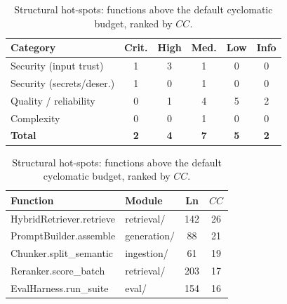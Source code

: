 \begin{table}[!tp]
  \centering
  \begin{minipage}[t]{0.42\textwidth}
    \centering
    \caption{Fused findings by severity and category ($N=20$).}
    \label{tab:severity}
    \renewcommand{\arraystretch}{1.25}
    \small
    \begin{tabularx}{\linewidth}{@{}X ccccc@{}}
      \toprule
      \textbf{Category} & \textbf{Crit.} & \textbf{High} & \textbf{Med.}
        & \textbf{Low} & \textbf{Info} \\
      \midrule
      Security (input trust)    & 1 & 3 & 1 & 0 & 0 \\
      Security (secrets/deser.) & 1 & 0 & 1 & 0 & 0 \\
      Quality / reliability     & 0 & 1 & 4 & 5 & 2 \\
      Complexity                & 0 & 0 & 1 & 0 & 0 \\
      \midrule
      \textbf{Total}            & \textbf{2} & \textbf{4} & \textbf{7}
        & \textbf{5} & \textbf{2} \\
      \bottomrule
    \end{tabularx}
  \end{minipage}\hfill
  \begin{minipage}[t]{0.55\textwidth}
    \centering
    \caption{Structural hot-spots: functions above the default
             cyclomatic budget, ranked by $CC$.}
    \label{tab:hotspots}
    \renewcommand{\arraystretch}{1.25}
    \small
    \begin{tabularx}{\linewidth}{@{}
        >{\ttfamily\scriptsize\raggedright\arraybackslash}X
        >{\ttfamily\scriptsize}l c c @{}}
      \toprule
      \normalfont\textbf{Function} & \normalfont\textbf{Module} &
      \normalfont\textbf{Ln} & \normalfont\textbf{$CC$} \\
      \midrule
      HybridRetriever.retrieve & retrieval/    & 142 & 26 \\
      PromptBuilder.assemble   & generation/   & \phantom{0}88 & 21 \\
      Chunker.split\_semantic  & ingestion/    & \phantom{0}61 & 19 \\
      Reranker.score\_batch    & retrieval/    & 203 & 17 \\
      EvalHarness.run\_suite   & eval/         & 154 & 16 \\
      \bottomrule
    \end{tabularx}
  \end{minipage}
\end{table}
